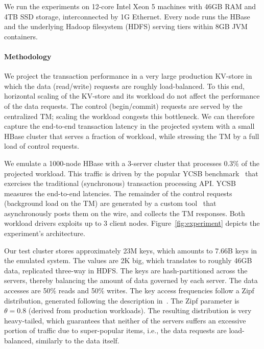 We run the experiments on 12-core Intel Xeon 5 machines with 46GB RAM and 4TB 
SSD storage, interconnected by 1G Ethernet.  Every node runs the HBase and the underlying 
Hadoop filesystem (HDFS) serving tiers within 8GB JVM containers. 

\paragraph{Methodology}
We project the transaction performance in a very large production KV-store in which the data (read/write) 
requests are roughly load-balanced. To this end, horizontal scaling of the KV-store and its workload do not 
affect the performance of the data requests. The control (begin/commit) requests are served by the centralized 
TM; scaling the workload congests this bottleneck. We can therefore capture the end-to-end transaction latency
in the projected system with a small HBase cluster that serves a fraction of workload, while stressing the TM 
by a full load of control requests. 

We emulate a 1000-node HBase with a 3-server cluster that processes $0.3\%$ of the projected workload. 
This traffic is driven by the popular YCSB benchmark~\cite{Cooper:2010:BCS:1807128.1807152} 
that exercises the traditional (synchronous) transaction processing API. YCSB measures the end-to-end latencies.
The remainder of the control requests (background load on the TM) are generated by a custom tool~\cite{Omid2017} 
that asynchronously posts them on the wire, and collects the TM responses. Both workload
drivers exploits up to 3 client nodes. Figure~\ref{fig:experiment} depicts the experiment's architecture. 

Our test cluster stores approximately 23M keys, which amounts to 7.66B keys in the emulated system. 
The values are 2K big, which translates to roughly 46GB data, replicated three-way in HDFS. The keys are hash-partitioned
across the servers, thereby balancing the amount of data governed by each server. The data accesses are 50\% reads and 
50\% writes. The key access frequencies follow a Zipf distribution, generated following the description in~\cite{Gray:1994:QGB:191839.191886}. 
The Zipf parameter is $\theta=0.8$ (derived from production workloads). The resulting distribution is very heavy-tailed, which 
guarantees that neither of the servers suffers an excessive portion of traffic due to super-popular items, i.e., the 
data requests are load-balanced, similarly to the data itself.  

